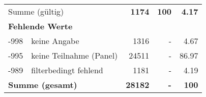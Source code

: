 \begin{longtable}{lXrrr}
     \midrule
     \multicolumn{2}{l}{Summe (gültig)} &
       \textbf{\num{1174}} &
     \textbf{\num{100}} &
       \textbf{\num[round-mode=places,round-precision=2]{4.17}} \\
     \multicolumn{5}{l}{\textbf{Fehlende Werte}}\\
       -998 &
       keine Angabe &
         \num{1316} &
        - &
         \num[round-mode=places,round-precision=2]{4.67} \\
       -995 &
       keine Teilnahme (Panel) &
         \num{24511} &
        - &
         \num[round-mode=places,round-precision=2]{86.97} \\
       -989 &
       filterbedingt fehlend &
         \num{1181} &
        - &
         \num[round-mode=places,round-precision=2]{4.19} \\
     \midrule
     \multicolumn{2}{l}{\textbf{Summe (gesamt)}} &
          \textbf{\num{28182}} &
        \textbf{-} &
        \textbf{\num{100}} \\
     \bottomrule
     \end{longtable}
     
